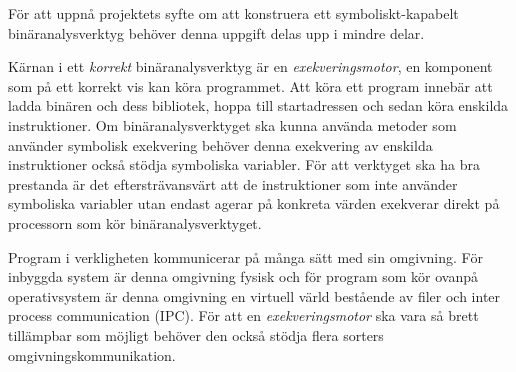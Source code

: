 

För att uppnå projektets syfte om att konstruera ett symboliskt-kapabelt
binäranalysverktyg behöver denna uppgift delas upp i mindre delar.

Kärnan i ett \textit{korrekt} binäranalysverktyg är en
\textit{exekveringsmotor}, en komponent som på ett korrekt vis kan köra
programmet. Att köra ett program innebär att ladda binären och dess bibliotek,
hoppa till startadressen och sedan köra enskilda instruktioner. Om
binäranalysverktyget ska kunna använda metoder som använder symbolisk exekvering
behöver denna exekvering av enskilda instruktioner också stödja symboliska
variabler. För att verktyget ska ha bra prestanda är det eftersträvansvärt att
de instruktioner som inte använder symboliska variabler utan endast agerar på
konkreta värden exekverar direkt på processorn som kör binäranalysverktyget.

Program i verkligheten kommunicerar på många sätt med sin omgivning. För
inbyggda system är denna omgivning fysisk och för program som kör ovanpå
operativsystem är denna omgivning en virtuell värld bestående av filer och inter
process communication (IPC). För att en \textit{exekveringsmotor} ska vara så
brett tillämpbar som möjligt behöver den också stödja flera sorters
omgivningskommunikation.

